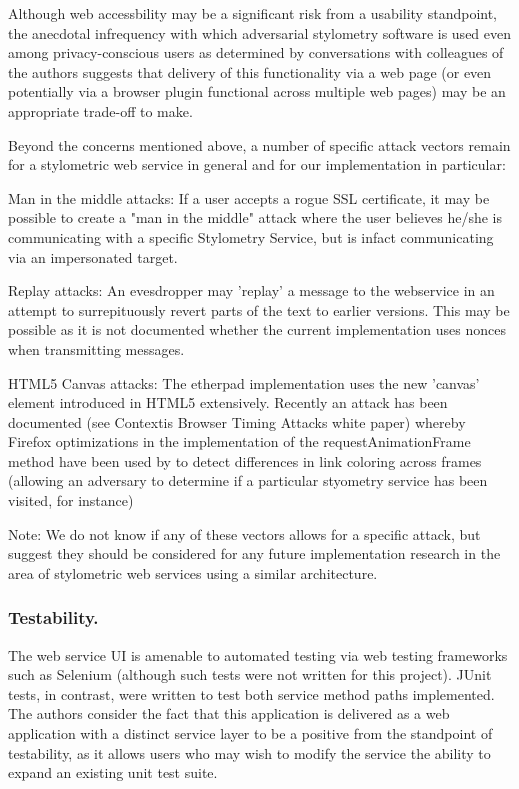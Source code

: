 \documentclass[letterpaper]{article}
\begin{document}
Although web accessbility may be a significant risk from a usability
standpoint, the anecdotal infrequency with which adversarial
stylometry software is used even among privacy-conscious users as
determined by conversations with colleagues of the authors
suggests that delivery of this functionality via a web page (or even
potentially via a browser plugin functional across multiple web pages)
may be an appropriate trade-off to make.

Beyond the concerns mentioned above, a number of specific attack
vectors remain for a stylometric web service in general and for our
implementation in particular:

Man in the middle attacks: If a user accepts a rogue SSL certificate, it
may be possible to create a "man in the middle" attack where the user
believes he/she is communicating with a specific Stylometry Service,
but is infact communicating via an impersonated target.

Replay attacks: An evesdropper may 'replay' a message to the
webservice in an attempt to surrepituously revert parts of the text to
earlier versions. This may be possible as it is not documented whether
the current implementation uses nonces when transmitting messages.

HTML5 Canvas attacks: The etherpad implementation uses the new
'canvas' element introduced in HTML5 extensively. Recently an attack
has been documented (see Contextis Browser Timing Attacks white paper) whereby
Firefox optimizations in the implementation of the
requestAnimationFrame method have been used by to detect differences
in link coloring across frames (allowing an adversary to determine if
a particular styometry service has been visited, for instance)

Note: We do not know if any of these vectors allows for a specific
attack, but suggest they should be considered for any future
implementation research in the area of stylometric web services using
a similar architecture.

\subsubsection{Testability.}

The web service UI is amenable to automated testing via web testing
frameworks such as Selenium (although such tests were not written for
this project). JUnit tests, in contrast, were written to test both
service method paths implemented. The authors consider the fact that
this application is delivered as a web application with a distinct
service layer to be a positive from the standpoint of testability, as
it allows users who may wish to modify the service the ability to
expand an existing unit test suite.
\end{document}
